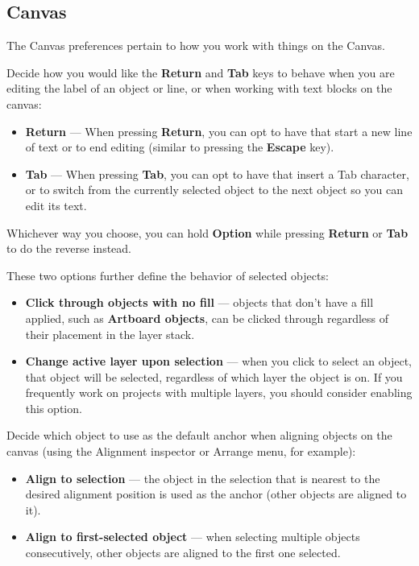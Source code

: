 \documentclass[../main.tex]{subfiles}
\begin{document}
\subsection{Canvas}

The Canvas preferences pertain to how you work with things on the Canvas.


\begin{description}[style=nextline]
  \item[{Text Editing}] Decide how you would like the \textbf{Return} and \textbf{Tab} keys to
    behave when you are editing the label of an object or line, or when working with text blocks
    on the canvas:

    \begin{itemize}
      \item \textbf{Return} --- When pressing \textbf{Return}, you can opt to have that start a
        new line of text or to end editing (similar to pressing the \textbf{Escape} key).
      \item \textbf{Tab} --- When pressing \textbf{Tab}, you can opt to have that insert a Tab
        character, or to switch from the currently selected object to the next object so you can
        edit its text.
    \end{itemize}

    Whichever way you choose, you can hold \textbf{Option} while pressing \textbf{Return} or
    \textbf{Tab} to do the reverse instead.
  \item[{Selection}] These two options further define the behavior of selected objects:

    \begin{itemize}
      \item \textbf{Click through objects with no fill} --- objects that don't have a fill
        applied, such as \textbf{Artboard objects}, can be clicked through regardless of their
        placement in the layer stack.
      \item \textbf{Change active layer upon selection} --- when you click to select an object,
        that object will be selected, regardless of which layer the object is on. If you
        frequently work on projects with multiple layers, you should consider enabling this
        option.
    \end{itemize}
  \item[{Alignment}] Decide which object to use as the default anchor when aligning objects on
    the canvas (using the Alignment inspector or Arrange menu, for example):

    \begin{itemize}
      \item \textbf{Align to selection} --- the object in the selection that is nearest to the
        desired alignment position is used as the anchor (other objects are aligned to it).
      \item \textbf{Align to first-selected object} --- when selecting multiple objects
        consecutively, other objects are aligned to the first one selected.
    \end{itemize}
\end{description}
\end{document}
